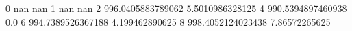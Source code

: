 0 nan nan
1 nan nan
2 996.0405883789062 5.5010986328125
4 990.5394897460938 0.0
6 994.7389526367188 4.199462890625
8 998.4052124023438 7.86572265625
